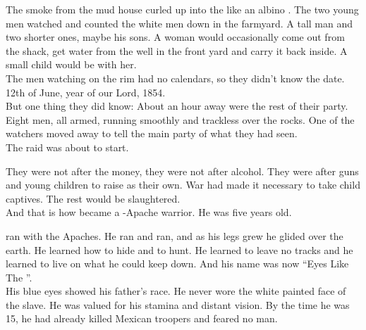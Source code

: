 The smoke from the mud house curled up into the  like an albino . The two young men watched and counted the white men down in the farmyard. A tall man and two shorter ones, maybe his sons. A woman would occasionally come out from the shack, get water from the well in the front yard and carry it back inside. A small child would be with her. \\

The men watching on the rim had no calendars, so they didn't know the date. 12th of June, year of our Lord, 1854. \\

But one thing they did know: About an hour away were the rest of their party. Eight men, all armed, running smoothly and trackless over the rocks. One of the watchers moved away to tell the main party of what they had seen. \\

The raid was about to start. \\




They were not after the money, they were not after alcohol. They were after guns and young children to raise as their own. War had made it necessary to take child captives. The rest would be slaughtered. \\

And that is how  became a -Apache warrior.
He was five years old. \\





 ran with the Apaches. He ran and ran, and as his legs grew he glided over the  earth. He learned how to hide and to hunt. He learned to leave no tracks and he learned to live on what he could keep down. And his name was now ``Eyes Like The ''. \\

His blue eyes showed his father's race. He never wore the white painted face of the slave. He was valued for his stamina and distant vision. By the time he was 15, he had already killed Mexican troopers and feared no man. \\

